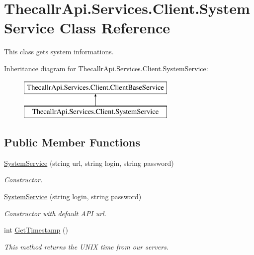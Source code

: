 \hypertarget{class_thecallr_api_1_1_services_1_1_client_1_1_system_service}{\section{Thecallr\+Api.\+Services.\+Client.\+System\+Service Class Reference}
\label{class_thecallr_api_1_1_services_1_1_client_1_1_system_service}
}


This class gets system informations.  


Inheritance diagram for Thecallr\+Api.\+Services.\+Client.\+System\+Service\+:\begin{figure}[H]
\begin{center}
\leavevmode
\includegraphics[height=2.000000cm]{class_thecallr_api_1_1_services_1_1_client_1_1_system_service}
\end{center}
\end{figure}
\subsection*{Public Member Functions}
\begin{DoxyCompactItemize}
\item 
\hyperlink{class_thecallr_api_1_1_services_1_1_client_1_1_system_service_a139f9329b6542e8ce9b321e5de0e4d0b}{System\+Service} (string url, string login, string password)
\begin{DoxyCompactList}\small\item\em Constructor. \end{DoxyCompactList}\item 
\hyperlink{class_thecallr_api_1_1_services_1_1_client_1_1_system_service_a1a51979c0cde9bcc42e4989818e088dc}{System\+Service} (string login, string password)
\begin{DoxyCompactList}\small\item\em Constructor with default A\+P\+I url. \end{DoxyCompactList}\item 
int \hyperlink{class_thecallr_api_1_1_services_1_1_client_1_1_system_service_aa0009a453dd3a16b399e9adb4c5050c2}{Get\+Timestamp} ()
\begin{DoxyCompactList}\small\item\em This method returns the U\+N\+I\+X time from our servers. \end{DoxyCompactList}\end{DoxyCompactItemize}
